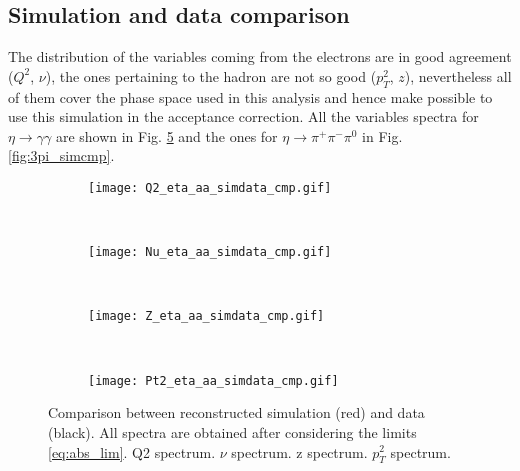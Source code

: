 \subsection{Simulation and data comparison}
The distribution of the variables coming from the electrons are in good agreement ($Q^2$, $\nu$), the ones pertaining to the hadron are not so good ($p_T^2$, $z$), nevertheless all of them cover the phase space used in this analysis and hence make possible to use this simulation in the acceptance correction. All the variables spectra for $\eta \rightarrow \gamma\gamma$ are shown in Fig. \ref{fig:aa_simcmp} and the ones for $\eta \rightarrow \pi^+\pi^-\pi^0$ in Fig. \ref{fig:3pi_simcmp}.
\begin{figure}[!ht]
\centering
\begin{subfigure}[b]{0.45\textwidth}
\texttt{[image: Q2\_eta\_aa\_simdata\_cmp.gif]}
\caption{}
\label{fig:Q2_aa_simcmp}
\end{subfigure}
~
\begin{subfigure}[b]{0.45\textwidth}
\texttt{[image: Nu\_eta\_aa\_simdata\_cmp.gif]}
\caption{}
\label{fig:Nu_aa_simcmp}
\end{subfigure}
~
\begin{subfigure}[b]{0.45\textwidth}
\texttt{[image: Z\_eta\_aa\_simdata\_cmp.gif]}
\caption{}
\label{fig:Z_aa_simcmp}
\end{subfigure}
~
\begin{subfigure}[b]{0.45\textwidth}
\texttt{[image: Pt2\_eta\_aa\_simdata\_cmp.gif]}
\caption{}
\label{fig:Pt2_aa_simcmp}
\end{subfigure}
\caption{Comparison between reconstructed simulation (red) and data (black). All spectra are obtained after considering the limits \eqref{eq:abs_lim}. \protect{} Q2 spectrum. \protect{} $\nu$ spectrum. \protect{} z spectrum. \protect{} $p_T^2$ spectrum.}
\label{fig:aa_simcmp}
\end{figure}
\clearpage
